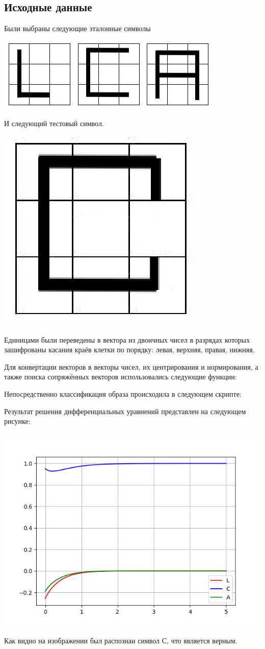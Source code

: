\documentclass[a4paper, 12pt]{article}
\begin{document}
\subsection{Исходные данные}
Были выбраны следующие эталонные символы
\begin{center}
  \centering
  \includegraphics[width=.7\linewidth]{extra/input.jpg}
  \label{fig:prplot}
\end{center}
И следующий тестовый символ.
\begin{center}
  \centering
  \includegraphics[width=.3\linewidth]{extra/test.png}
  \label{fig:prplot}
\end{center}
Единицами были переведены в вектора из двоичных чисел в разрядах которых зашифрованы касания краёв клетки по порядку: левая, верхняя, правая, нижняя.

Для конвертации векторов в векторы чисел, их центрирования и нормирования, а также поиска сопряжённых векторов использовались следующие функции:

Непосредственно классификация образа происходила в следующем скрипте:


Результат решения дифференциальных уравнений представлен на следующем рисунке:
\begin{center}
  \centering
  \includegraphics[width=.7\linewidth]{extra/output.png}
  \label{fig:prplot}
\end{center}
Как видно на изображении был распознан символ С, что является верным.
\newpage
\end{document}
